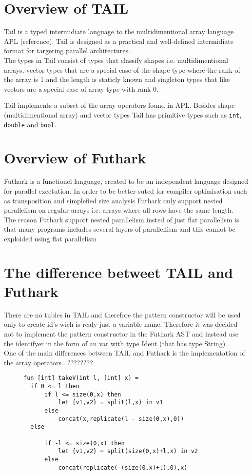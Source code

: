 \documentclass[11pt]{article}
\begin{document}
\section{Overview of TAIL}
Tail is a typed intermidiate language to the multidimentional array language APL (reference). Tail is designed as a practical and well-defined intermidiate format for targeting parallel architectures.\\ 

The types in Tail consist of types that classify shapes i.e. multidimentional arrays, vector types that are a special case of the shape type where the rank of the array is 1 and the length is staticly known and singleton types that like vectors are a special case of array type with rank 0. 

Tail implements a subset of the array operators found in APL.
Besides shape (multidimentional array) and vector types Tail has primitive types such as \verb|int|, \verb|double| and \verb|bool|.

\section{Overview of Futhark}
Futhark is a functionel language, created to be an independent language designed for parallel exectution. In order to be better suted for compiler optimisation such as transposition and simplefied size analysis Futhark only support nested parallelism on regular arrays i.e. arrays where all rows have the same length.\\

The reason Futhark support nested parallelism insted of just flat parallelism is that many programs includes several layers of parallellism and this cannot be exploided using flat parallelism %

\section{The difference betweet TAIL and Futhark}
There are no tubles in TAIL and therefore the pattern constructor will be used only to create id's wich is realy just a variable name. Therefore it was decided not to implement the pattern constructor in the Futhark AST and instead use the identifyer in the form of an var with type Ident (that has type String). \\

One of the main differences between TAIL and Futhark is the implementation of the array operators...???????? \\
\begin{figure}
\begin{lstlisting}
fun [int] takeV(int l, [int] x) =
  if 0 <= l then
      if l <= size(0,x) then
          let {v1,v2} = split(l,x) in v1
      else
          concat(x,replicate(l - size(0,x),0))
  else
  
      if -l <= size(0,x) then
          let {v1,v2} = split(size(0,x)+l,x) in v2
      else
          concat(replicate(-(size(0,x)+l),0),x)
\end{lstlisting}
\end{figure}
\end{document}
